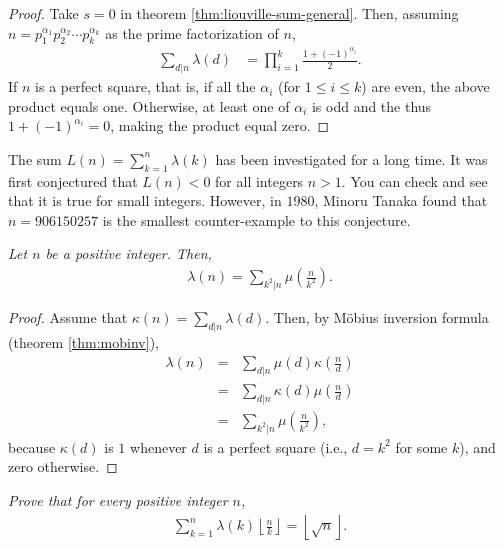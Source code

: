 \documentclass[12pt]{subfile}
\begin{document}
		\begin{proof}
			Take $s=0$ in theorem \ref{thm:liouville-sum-general}. Then, assuming $n= p_1^{\alpha_1} p_2^{\alpha_2} \cdots p_k^{\alpha_k}$ as the prime factorization of $n$,
				\begin{align*}
					\sum_{d|n}\lambda(d) &= \prod_{i=1}^{k}\frac{1 + (-1)^{\alpha_i}}{2}.
				\end{align*}
			If $n$ is a perfect square, that is, if all the $\alpha_i$ (for $1 \leq i \leq k$) are even, the above product equals one. Otherwise, at least one of $\alpha_i$ is odd and the thus $1 + (-1)^{\alpha_i}=0$, making the product equal zero.
		\end{proof}

		\begin{remark}
			The sum $L(n)= \sum\limits_{k=1}^{n} \lambda(k)$ has been investigated for a long time. It was first conjectured that $L(n) <0$ for all integers $n >1$. You can check and see that it is true for small integers. However, in $1980$, Minoru Tanaka found that $n=906150257$ is the smallest counter-example to this conjecture.
		\end{remark}
		\begin{theorem}\slshape
			Let $n$ be a positive integer. Then,
				\begin{align*}
					\lambda(n) = \sum_{k^2|n}  \mu \left(\frac{n}{k^2}\right).
				\end{align*}
		\end{theorem}

		\begin{proof}
			Assume that $\displaystyle \kappa(n)=\sum\limits_{d|n}\lambda(d)$. Then, by M\"{o}bius inversion formula (theorem \ref{thm:mobinv}),
				\begin{eqnarray*}
					\lambda(n) &=& \sum_{d|n}\mu(d)\kappa\left(\frac nd\right)\\
						  &=& \sum_{d|n}\kappa(d)\mu\left(\frac nd\right)\\
						  &=& \sum_{k^2|n}  \mu \left(\frac{n}{k^2}\right),
				\end{eqnarray*}
			because $\kappa(d)$ is $1$ whenever $d$ is a perfect square (i.e., $d=k^2$ for some $k$), and zero otherwise.
		\end{proof}

		\begin{theorem}\slshape\label{thm:liouville-square-floor}
			Prove that for every positive integer $n$,
				\begin{align*}
					\sum_{k=1}^{n} \lambda(k) \left\lfloor \frac{n}{k}\right\rfloor = \left\lfloor \sqrt n\right \rfloor.
				\end{align*}
		\end{theorem}
\end{document}
